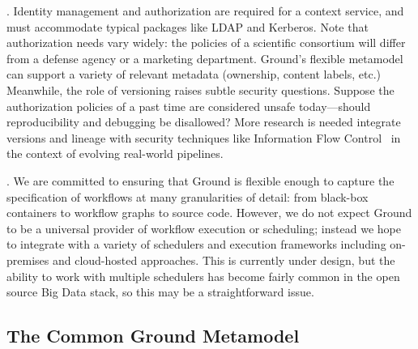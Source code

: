 \documentclass{sig-alternate}
\begin{document}
.  
Identity management and authorization are required for a context service, and must accommodate typical packages like LDAP and Kerberos.  
Note that authorization needs vary widely: the policies of a scientific consortium will differ from a defense agency or a marketing department.  
Ground's flexible metamodel can support a variety of relevant metadata (ownership, content labels, etc.) 
Meanwhile, the role of versioning raises
subtle security questions.
Suppose the authorization policies of a past time are considered unsafe today---should reproducibility and debugging be disallowed? 
More research is needed integrate
versions and lineage 
with security techniques like Information Flow Control~\cite{zeldovich2008securing} in the context of evolving real-world pipelines.

. 
We are committed to ensuring that Ground is flexible enough to capture the specification of workflows at many granularities of detail: from black-box containers to workflow graphs to source code.  
However, we do not expect Ground to be a universal provider of workflow execution or scheduling; instead we hope to integrate with a variety of schedulers and execution frameworks including on-premises and cloud-hosted approaches. 
This is currently under design, but the ability to work with multiple schedulers has become fairly common in the open source Big Data stack, so this may be a straightforward issue.

\smallitembot

\subsection{The Common Ground Metamodel}
\label{sec:metamodel}
\end{document}
